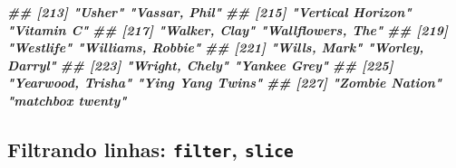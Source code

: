 \documentclass[
  11pt]{report}
\newenvironment{Shaded}{\begin{snugshade}}{\end{snugshade}}
\newcommand{\DocumentationTok}[1]{\textcolor[rgb]{0.56,0.35,0.01}{\textbf{\textit{#1}}}}
\renewenvironment{Shaded}{
    \begin{mdframed}[%
      roundcorner=2pt,%
      innerleftmargin=5pt,%
      innerrightmargin=5pt,%
      topline=true,%
      leftline=true,%
      rightline=true,%
      bottomline=true,%
      linewidth=0.5pt,%
      linecolor=black!20,%
      backgroundcolor=black!2,%
      skipabove=2ex,%
      skipbelow=2.5ex%
    ]%
  }
  {
    \end{mdframed}
  }
\begin{document}
\begin{itemize}
\begin{Shaded}
\begin{Highlighting}[]
\DocumentationTok{\#\# [213] "Usher"                          "Vassar, Phil"                  }
\DocumentationTok{\#\# [215] "Vertical Horizon"               "Vitamin C"                     }
\DocumentationTok{\#\# [217] "Walker, Clay"                   "Wallflowers, The"              }
\DocumentationTok{\#\# [219] "Westlife"                       "Williams, Robbie"              }
\DocumentationTok{\#\# [221] "Wills, Mark"                    "Worley, Darryl"                }
\DocumentationTok{\#\# [223] "Wright, Chely"                  "Yankee Grey"                   }
\DocumentationTok{\#\# [225] "Yearwood, Trisha"               "Ying Yang Twins"               }
\DocumentationTok{\#\# [227] "Zombie Nation"                  "matchbox twenty"}
\end{Highlighting}
\end{Shaded}
\end{itemize}

\hypertarget{filtrando-linhas-filter-slice}{%
\subsection{\texorpdfstring{Filtrando linhas: \texttt{filter}, \texttt{slice}}{Filtrando linhas: filter, slice}}\label{filtrando-linhas-filter-slice}}
\end{document}
